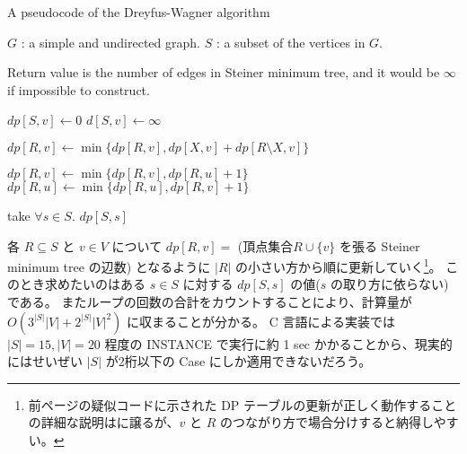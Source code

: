 \documentclass[12pt,uplatex,dvipdfmx,titlepage]{article}
\theoremstyle{case}
\begin{document}
    \begin{algorithm}
        \caption{A pseudocode of the Dreyfus-Wagner algorithm}
        \begin{algorithmic}[1]
            \Require
            \Statex $G$ : a simple and undirected graph.
            \Statex $S$ : a subset of the vertices in $G$.

            \Ensure
            \Statex Return value is the number of edges in Steiner minimum tree, and it would be $\infty$ if impossible to construct.
            \Statex

             
                \State $dp[S,v] \gets 0$
            \EndFor
                \State $d[S,v] \gets \infty$
            \EndFor
            \Statex

             
                        \State $dp[R,v] \gets \min\{dp[R,v], dp[X, v]+dp[R\setminus X, v]\}$
                    \EndFor
                \EndFor
                \Statex

                 
                        \State $dp[R,v] \gets \min\{dp[R,v],dp[R,u]+1\}$
                        \State $dp[R,u] \gets \min\{dp[R,u],dp[R,v]+1\}$
                    \EndFor
                \EndFor
            \EndFor
            \Statex

            \State take $\forall s\in S$.
            \State \Return $dp[S,s]$
            \EndFunction
        \end{algorithmic}
    \end{algorithm}
    各 $R \subseteq S$ と $v\in V$ について $dp[R,v]=$ (頂点集合$R\cup \{v\}$ を張る Steiner minimum tree の辺数) となるように $|R|$ の小さい方から順に更新していく\footnote{前ページの疑似コードに示された DP テーブルの更新が正しく動作することの詳細な説明は\cite{DW}に譲るが、$v$ と $R$ のつながり方で場合分けすると納得しやすい。}。
    このとき求めたいのはある $s\in S$ に対する $dp[S,s]$ の値($s$ の取り方に依らない)である。
    またループの回数の合計をカウントすることにより、計算量が $O(3^{|S|}|V|+2^{|S|}|V|^2)$ に収まることが分かる。
    C 言語による実装では $|S| = 15, |V| = 20$ 程度の INSTANCE で実行に約 1 sec かかることから、現実的にはせいぜい $|S|$ が2桁以下の Case にしか適用できないだろう。
\end{document}
